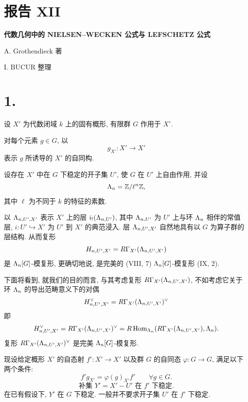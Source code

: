 \clearpage{}
\section*{报告 XII}

\begin{center}
\Large\bfseries 代数几何中的 NIELSEN--WECKEN 公式与 LEFSCHETZ 公式
\end{center}

\begin{center}
A. Grothendieck 著

I. BUCUR 整理
\end{center}

\bigskip

\section*{1.}
设 $X'$ 为代数闭域 $k$ 上的固有概形, 有限群 $G$ 作用于 $X'$.

对每个元素 $g\in G$, 以
\[
g_{X'}:X'\to X'
\]
表示 $g$ 所诱导的 $X'$ 的自同构.

设存在 $X'$ 中在 $G$ 下稳定的开子集 $U'$, 使 $G$ 在 $U'$ 上自由作用, 并设
\[
\Lambda_n=\mathbb Z/\ell^n\mathbb Z,
\]
其中 $\ell$ 为不同于 $k$ 的特征的素数.

以 $\Lambda_{n,U',X'}$ 表示 $X'$ 上的层 $i_!(\Lambda_{n,U'})$, 其中 $\Lambda_{n,U'}$ 为 $U'$ 上与环 $\Lambda_n$ 相伴的常值层, $i:U'\hookrightarrow X'$ 为 $U'$ 到 $X'$ 的典范浸入. 层 $\Lambda_{n,U',X'}$ 自然地具有以 $G$ 为算子群的层结构. 从而复形
\[
H_{n,U',X'}=R\Gamma_{X'}(\Lambda_{n,U',X'})
\]
是 $\Lambda_n[G]$-模复形, 更确切地说, 是完美的 (VIII, 7) $\Lambda_n[G]$-模复形 (IX, 2).

下面将看到, 就我们的目的而言, 与其考虑复形 $R\Gamma_{X'}(\Lambda_{n,U',X'})$, 不如考虑它关于环 $\Lambda_n$ 的导出范畴意义下的对偶
\[
H_{n,U',X'}^\vee=R\Gamma_{X'}(\Lambda_{n,U',X'})^\vee
\]
即
\[
H_{n,U',X'}^\vee
=R\Gamma_{X'}(\Lambda_{n,U',X'})^\vee
=R\operatorname{Hom}_{\Lambda_n}(R\Gamma_{X'}(\Lambda_{n,U',X'}),\Lambda_n).
\]
复形 $R\Gamma_{X'}(\Lambda_{n,U',X'})^\vee$ 是完美 $\Lambda_n[G]$-模复形.

现设给定概形 $X'$ 的自态射 $f':X'\to X'$ 以及群 $G$ 的自同态 $\varphi:G\to G$, 满足以下两个条件:
\begin{equation}\tag{1.1}
f'g_{X'}=\varphi(g)_{X'}f'\qquad \forall g\in G .
\end{equation}
\begin{equation}\tag{1.2}
\text{补集 }Y'=X'-U'\text{ 在 }f'\text{ 下稳定}.
\end{equation}
在已有假设下, $Y'$ 在 $G$ 下稳定. 一般并不要求开子集 $U'$ 在 $f'$ 下稳定.

